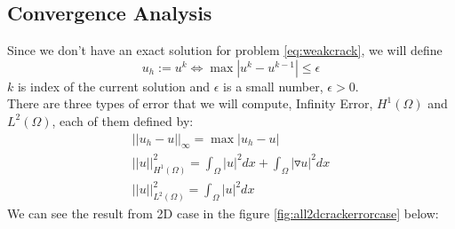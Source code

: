 \documentclass[a4paper,11pt]{article}
\begin{document}
\subsection{Convergence Analysis}
Since we don't have an exact solution for problem \eqref{eq:weakcrack}, we will define $$u_h:= u^k \iff \max|u^k-u^{k-1}| \leq \epsilon$$ $k$ is index of the current solution and $\epsilon$ is a small number, $\epsilon > 0$.\\
There are three types of error that we will compute, Infinity Error, $H^1(\Omega)$ and $L^2(\Omega)$, each of them defined by:
\begin{eqnarray}
||u_h - u||_\infty = \max|u_h-u|\\
||u||^2_{H^1(\Omega)} = \int_\Omega |u|^2 dx + \int_\Omega |\triangledown u|^2 dx\\
||u||^2_{L^2(\Omega)} = \int_\Omega |u|^2 dx
\end{eqnarray}
We can see the result from 2D case in the figure \ref{fig:all2dcrackerrorcase} below:
\end{document}
